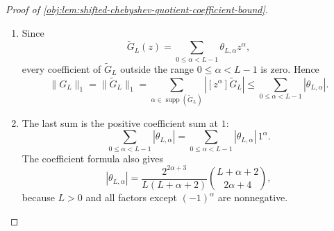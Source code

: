 \begin{proof}[Proof of \cref{obj:lem:shifted-chebyshev-quotient-coefficient-bound}]
\begin{enumerate}
zero convention leaves, respectively,
\[
\begin{aligned}
(-1)^{r+1}(r+2)4^{r+1}
&=2\left((-1)^{r+1}\frac{4^{r+1}}2\right)
-4\left((-1)^r(r+1)4^r\right),\\
(-1)^{r+2}\frac{4^{r+2}}2
&=-4\left((-1)^{r+1}\frac{4^{r+1}}2\right),
\end{aligned}
\]
so the recurrence holds there as well.  Since the formula agrees with \(Q_0,Q_1\),
induction proves, for every real \(z\),
\[
T_L(1-2z)
=
1+
\sum_{1\le \nu\le L}
(-1)^\nu\frac{L}{L+\nu}
\binom{L+\nu}{2\nu}4^\nu z^\nu .
\]
The \(\nu=1\) term is \(-2L^2z\).  For the remaining terms write
\(\nu=\alpha+2\).  Then
\[
(-1)^{\alpha+2}\frac{L}{L+\alpha+2}
\binom{L+\alpha+2}{2\alpha+4}4^{\alpha+2}z^{\alpha+2}
=
2L^2\theta_{L,\alpha}z^{\alpha+2},
\]
so, with \(Q_L(z)=T_L(1-2z)\),
\[
Q_L(z)
=
1-2L^2z+2L^2z^2\widetilde G_L(z).
\]
Using these quotient identities, since \(Q_L(0)=1\), the polynomial
\[
H_L(z)=\frac{1-Q_L(z)}{2L^2}
\]
has zero constant term. Moreover \(Q_L'(0)=-2T_L'(1)=-2L^2\), so \(H_L'(0)=1\), and hence the quotient identity for \(E_L\) gives \(E_L(0)=1\). Thus \(1-E_L\) has zero constant term, as required for the quotient identity defining \(G_L\). Using the displayed formula for \(Q_L\),
\[
H_L(z)
=\frac{1-Q_L(z)}{2L^2}
=z-z^2\widetilde G_L(z)
=z(1-z\widetilde G_L(z)).
\]
Thus
\[
zE_L(z)=z(1-z\widetilde G_L(z)).
\]
Because multiplication by the nonzero indeterminate \(z\) is cancellative in \(\mathbb R[z]\),
\[
E_L(z)=1-z\widetilde G_L(z).
\]
Consequently
\[
zG_L(z)=1-E_L(z)=z\widetilde G_L(z),
\]
and the same cancellation gives
\[
G_L(z)=\widetilde G_L(z)
\]
as polynomials. %

\item Since
\[
\widetilde G_L(z)=\sum_{0\le \alpha<L-1}\theta_{L,\alpha}z^\alpha,
\]
every coefficient of \(\widetilde G_L\) outside the range \(0\le \alpha<L-1\) is zero. Hence
\[
\|G_L\|_1
=
\|\widetilde G_L\|_1
=
\sum_{\alpha\in\operatorname{supp}(\widetilde G_L)}
   |[z^\alpha]\widetilde G_L|
\le
\sum_{0\le \alpha<L-1}|\theta_{L,\alpha}|.
\]

\item The last sum is the positive coefficient sum at \(1\):
\[
\sum_{0\le \alpha<L-1}|\theta_{L,\alpha}|
=
\sum_{0\le \alpha<L-1}|\theta_{L,\alpha}|\,1^\alpha .
\]
The coefficient formula also gives
\[
|\theta_{L,\alpha}|
=
\frac{2^{2\alpha+3}}{L(L+\alpha+2)}
\binom{L+\alpha+2}{2\alpha+4},
\]
because \(L>0\) and all factors except \((-1)^\alpha\) are nonnegative. %


\end{enumerate}
\end{proof}
